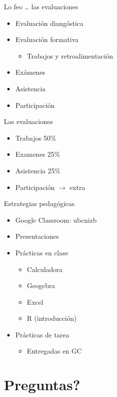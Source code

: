 \documentclass[
  11pt,
  ignorenonframetext,
]{beamer}
\providecommand{\tightlist}{%
  \setlength{\itemsep}{0pt}\setlength{\parskip}{0pt}}
\begin{document}
\begin{frame}{Lo feo \ldots{} las evaluaciones}
\protect\hypertarget{lo-feo-las-evaluaciones}{}
\begin{itemize}
\item
  Evaluación diangóstica
\item
  Evaluación formativa

  \begin{itemize}
  \tightlist
  \item
    Trabajos y retroalimentación
  \end{itemize}
\item
  Exámenes
\item
  Asistencia
\item
  Participación
\end{itemize}
\end{frame}

\begin{frame}{Las evaluaciones}
\protect\hypertarget{las-evaluaciones}{}
\begin{itemize}
\tightlist
\item
  Trabajos 50\%
\item
  Examenes 25\%
\item
  Asistencia 25\%
\item
  Participación \(\rightarrow\) extra
\end{itemize}
\end{frame}

\begin{frame}{Estrategias pedagógicas}
\protect\hypertarget{estrategias-pedaguxf3gicas}{}
\begin{itemize}
\item
  Google Classroom: ubcnizb
\item
  Presentaciones
\item
  Prácticas en clase

  \begin{itemize}
  \tightlist
  \item
    Calculadora
  \item
    Geogebra
  \item
    Excel
  \item
    R (introducción)
  \end{itemize}
\item
  Prácticas de tarea

  \begin{itemize}
  \tightlist
  \item
    Entregadas en GC
  \end{itemize}
\end{itemize}
\end{frame}

\hypertarget{preguntas}{%
\section{Preguntas?}\label{preguntas}}
\end{document}
